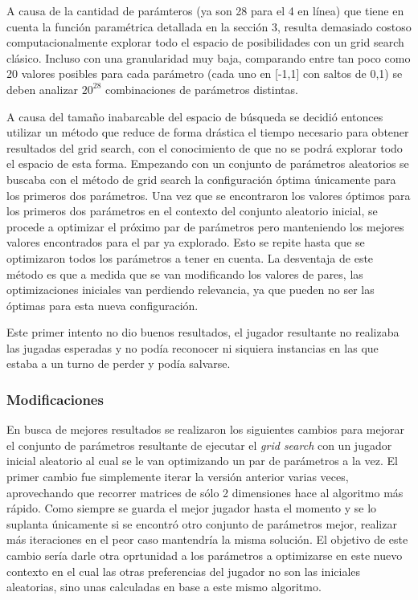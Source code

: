 \documentclass[A4paper,oneside,fleqn,11pt]{article}
\theoremstyle{definition}
\begin{document}
A causa de la cantidad de parámteros (ya son 28 para el 4 en línea) que tiene en cuenta la función paramétrica detallada en la sección 3, resulta demasiado costoso computacionalmente explorar todo el espacio de posibilidades con un grid search clásico. Incluso  con una granularidad muy baja, comparando entre tan poco como 20 valores posibles para cada parámetro (cada uno en [-1,1] con saltos de 0,1) se deben analizar $ 20^{28}$ combinaciones de parámetros distintas.

A causa del tamaño inabarcable del espacio de búsqueda se decidió entonces utilizar un método que reduce de forma drástica el tiempo necesario para obtener resultados del grid search, con el conocimiento de que no se podrá explorar todo el espacio de esta forma. Empezando con un conjunto de parámetros aleatorios se buscaba con el método de grid search la configuración óptima únicamente para los primeros dos parámetros. Una vez que se encontraron los valores óptimos para los primeros dos parámetros en el contexto del conjunto aleatorio inicial, se procede a optimizar el próximo par de parámetros pero manteniendo los mejores valores encontrados para el par ya explorado. Esto se repite hasta que se optimizaron todos los parámetros a tener en cuenta. La desventaja de este método es que a medida que se van modificando los valores de pares, las optimizaciones iniciales van perdiendo relevancia, ya que pueden no ser las óptimas para esta nueva configuración.

Este primer intento no dio buenos resultados, el jugador resultante no realizaba las jugadas esperadas y no podía reconocer ni siquiera instancias en las que estaba a un turno de perder y podía salvarse.


\subsubsection{Modificaciones}

En busca de mejores resultados se realizaron los siguientes cambios para mejorar el conjunto de parámetros resultante de ejecutar el \textit{grid search} con un jugador inicial aleatorio al cual se le van optimizando un par de parámetros a la vez. El primer cambio fue simplemente iterar la versión anterior varias veces, aprovechando que recorrer matrices de sólo 2 dimensiones hace al algoritmo más rápido. Como siempre se guarda el mejor jugador hasta el momento y se lo suplanta únicamente si se encontró otro conjunto de parámetros mejor, realizar más iteraciones en el peor caso mantendría la misma solución. El objetivo de este cambio sería darle otra oprtunidad a los parámetros a optimizarse en este nuevo contexto en el cual las otras preferencias del jugador no son las iniciales aleatorias, sino unas calculadas en base a este mismo algoritmo. 
\end{document}

